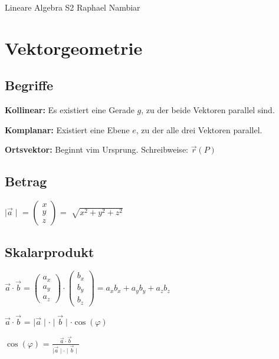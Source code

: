 



\begin{multicols*}{3}

\DocumentInfo
{Lineare Algebra S2} %
{Raphael Nambiar} %

\WhiteSpace

\section{Vektorgeometrie}
\subsection{Begriffe}

\textbf{Kollinear:} Es existiert eine Gerade $g$, zu der beide Vektoren parallel sind. 

\textbf{Komplanar:} Existiert eine Ebene $e$, zu der alle drei Vektoren parallel. 

\textbf{Ortsvektor:} Beginnt vim Ursprung. Schreibweise: $\vec{r}(P) $ 

\subsection{Betrag}

$\mid \vec{a} \mid  $ = 
$\begin{pmatrix}
x\\
y\\
z
\end{pmatrix}$ = $ \sqrt[]{x^2+y^2+z^2}$
\WhiteSpace
\subsection{Skalarprodukt}

$\vec{a} \cdot \vec{b} =  \begin{pmatrix}
a_x\\
a_y\\
a_z
\end{pmatrix} \cdot \begin{pmatrix}
b_x\\
b_y\\
b_z
\end{pmatrix} = a_xb_x+a_yb_y+a_zb_z$

$ \vec{a} \cdot \vec{b} $ = $ \mid \vec{a} \mid \cdot \mid \vec{b} \mid \cdot \cos(\varphi)$

$\cos(\varphi) $ = $\frac{\vec{a} \cdot \vec{b}}{\mid \vec{a} \mid \cdot \mid \vec{b} \mid} $


\end{multicols*}
